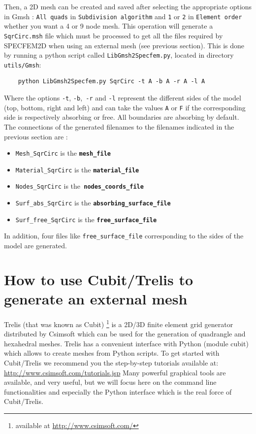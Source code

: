 Then, a 2D mesh can be created and saved after selecting the appropriate
options in Gmsh : \texttt{All quads} in \texttt{Subdivision algorithm}
and \texttt{1} or \texttt{2} in \texttt{Element order} whether you
want a 4 or 9 node mesh. This operation will generate a \texttt{SqrCirc.msh}
file which must be processed to get all the files required by SPECFEM2D
when using an external mesh (see previous section). This is done by
running a python script called \texttt{LibGmsh2Specfem.py}, located in
directory \texttt{utils/Gmsh}:
%
\begin{verbatim}
    python LibGmsh2Specfem.py SqrCirc -t A -b A -r A -l A
\end{verbatim}
%
Where the options \texttt{-t}, \texttt{-b},\texttt{ -r} and \texttt{-l}
represent the different sides of the model (top, bottom, right and
left) and can take the values \texttt{A} or \texttt{F} if the corresponding
side is respectively absorbing or free. All boundaries are absorbing
by default. The connections of the generated filenames to the filenames
indicated in the previous section are :
%
\begin{itemize}
\item \texttt{Mesh\_SqrCirc} is the \texttt{\textbf{mesh\_file}}
\item \texttt{Material\_SqrCirc} is the \texttt{\textbf{material\_file}}
\item \texttt{Nodes\_SqrCirc} is the\texttt{ }\texttt{\textbf{nodes\_coords\_file}}
\item \texttt{Surf\_abs\_SqrCirc} is the \texttt{\textbf{absorbing\_surface\_file}}
\item \texttt{Surf\_free\_SqrCirc} is the \texttt{\textbf{free\_surface\_file}}
\end{itemize}
%
In addition, four files like \texttt{free\_surface\_file} corresponding
to the sides of the model are generated.

\section{How to use Cubit/Trelis to generate an external mesh}
Trelis (that was known as Cubit)%
\footnote{available at \url{http://www.csimsoft.com/}}
is a 2D/3D finite element grid generator distributed by Csimsoft which can be
used for the generation of quadrangle and hexahedral meshes. Trelis has a convenient
interface with Python (module cubit) which allows to create meshes from Python scripts. To get
started with Cubit/Trelis we recommend you the step-by-step tutorials available at:
\url{http://www.csimsoft.com/tutorials.jsp}
Many powerful graphical tools are available, and very useful, but we will focus here on
the command line functionalities and especially the Python interface which is the real force of
Cubit/Trelis.


